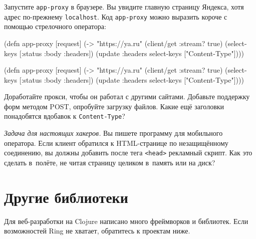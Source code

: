 \fi

Запустите \verb|app-proxy| в браузере. Вы увидите главную страницу Яндекса,
хотя адрес по-прежнему \verb|localhost|. Код \verb|app-proxy| можно выразить
короче с помощью стрелочного оператора:

\ifnarrow

\begin{english}
  \begin{clojure}
(defn app-proxy [request]
  (-> "https://ya.ru"
      (client/get {:stream? true})
      (select-keys [:status
                    :body :headers])
      (update :headers
        select-keys ["Content-Type"])))
  \end{clojure}
\end{english}

\else

\begin{english}
  \begin{clojure}
(defn app-proxy [request]
  (-> "https://ya.ru"
      (client/get {:stream? true})
      (select-keys [:status :body :headers])
      (update :headers select-keys ["Content-Type"])))
  \end{clojure}
\end{english}

\fi

Доработайте прокси, чтобы он работал с другими сайтами. Добавьте поддержку форм
методом POST, опробуйте загрузку файлов. Какие ещё заголовки понадобятся
вдобавок к \texttt{Con\-tent\--Ty\-pe}?

\emph{Задача для настоящих хакеров.} Вы пишете программу для мобильного
оператора. Если клиент обратился к HTML-странице по незащищённому соединению, вы
должны добавить после тега \verb|<head>| рекламный скрипт. Как это сделать
в~полёте, не читая страницу целиком в~память или на диск?

\section{Другие библиотеки}

Для веб-разработки на Clojure написано много фреймворков и библиотек. Если
возможностей Ring не хватает, обратитесь к проектам ниже.

